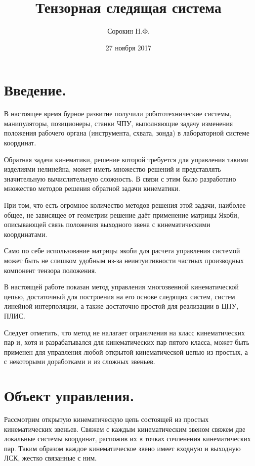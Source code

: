\documentclass{article}
\begin{document}
\date{27 ноября 2017}

\title{Тензорная следящая система}
\author{Сорокин Н.Ф.}

\maketitle
\newpage

\section{Введение.}

В настоящее время бурное развитие получили робототехнические системы, манипуляторы, позиционеры, станки ЧПУ, выполняющие задачу изменения положения рабочего органа (инструмента, схвата, зонда) в лабораторной системе координат.

Обратная задача кинематики, решение которой требуется для управления такими изделиями нелинейна, может иметь множество решений и представлять значительную вычислительную сложность. В связи с этим было разработано множество методов решения обратной задачи кинематики.

При том, что есть огромное количество методов решения этой задачи, наиболее общее, не зависящее от геометрии решение даёт применение матрицы Якоби, описывающей связь положения выходного звена с кинематическими координатами.

Само по себе использование матрицы якоби для расчета управления системой может быть не слишком удобным из-за неинтуитивности частных производных компонент тензора положения. 

В настоящей работе показан метод управления многозвенной кинематической цепью, достаточный для построения на его основе следящих систем, систем линейной интерполяции, а также достаточно простой для реализации в ЦПУ, ПЛИС. 

Следует отметить, что метод не налагает ограничения на класс кинематических пар и, хотя и разрабатывался для кинематических пар пятого класса, может быть применен для управления любой открытой кинематической цепью из простых, а с некоторыми доработками и из сложных звеньев.

\newpage
\section{Объект управления.}

Рассмотрим открытую кинематическую цепь состоящей из простых кинематических звеньев. Свяжем с каждым кинематическим звеном свяжем две локальные системы координат, распожив их в точках сочленения кинематических пар. Таким образом каждое кинематическое звено имеет входную и выходную ЛСК, жестко связанные с ним.
\end{document}
